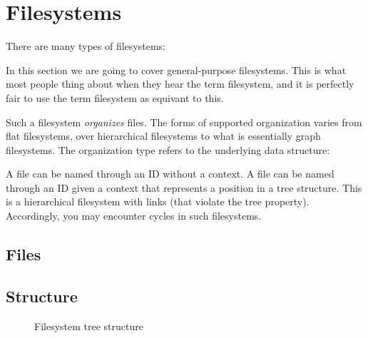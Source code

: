 

\section{Filesystems}

There are many types of filesystems:
\begin{itemize}
\end{itemize}

In this section we are going to cover general-purpose filesystems. This is what most people thing about when they hear the term filesystem, and it is perfectly fair to use the term filesystem as equivant to this.

Such a filesystem \textsl{organizes} files. The forms of supported organization varies from flat filesystems, over hierarchical filesystems to what is essentially graph filesystems. The organization type refers to the underlying data structure:
\begin{itemize}
   A file can be named through an ID without a context.
   A file can be named through an ID given a context that represents a position in a tree structure.
   This is a hierarchical filesystem with links (that violate the tree property). Accordingly, you may encounter cycles in such filesystems.
\end{itemize}

\subsection{Files}

\subsection{Structure}


\begin{figure}[tbp]
  \begin{center}
  \end{center}
  \caption{Filesystem tree structure}
  \label{fig:topics:fs:dir}
\end{figure}


